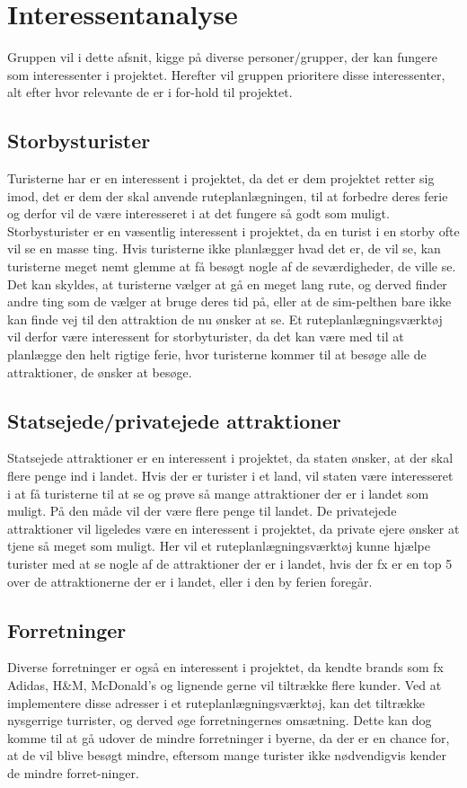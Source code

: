 \section{Interessentanalyse}

Gruppen vil i dette afsnit, kigge på diverse personer/grupper, der kan fungere som interessenter i projektet. Herefter vil gruppen prioritere disse interessenter, alt efter hvor relevante de er i for-hold til projektet.

\subsection{Storbysturister}
Turisterne har er en interessent i projektet, da det er dem projektet retter sig imod, det er dem der skal anvende ruteplanlægningen, til at forbedre deres ferie og derfor vil de være interesseret i at det fungere så godt som muligt. 
Storbysturister er en væsentlig interessent i projektet, da en turist i en storby ofte vil se en masse ting. Hvis turisterne ikke planlægger hvad det er, de vil se, kan turisterne meget nemt glemme at få besøgt nogle af de seværdigheder, de ville se. Det kan skyldes, at turisterne vælger at gå en meget lang rute, og derved finder andre ting som de vælger at bruge deres tid på, eller at de sim-pelthen bare ikke kan finde vej til den attraktion de nu ønsker at se. Et ruteplanlægningsværktøj vil derfor være interessent for storbyturister, da det kan være med til at planlægge den helt rigtige ferie, hvor turisterne kommer til at besøge alle de attraktioner, de ønsker at besøge.

\subsection{Statsejede/privatejede attraktioner}
Statsejede attraktioner er en interessent i projektet, da staten ønsker, at der skal flere penge ind i landet. Hvis der er turister i et land, vil staten være interesseret i at få turisterne til at se og prøve så mange attraktioner der er i landet som muligt. På den måde vil der være flere penge til landet. 
De privatejede attraktioner vil ligeledes være en interessent i projektet, da private ejere ønsker at tjene så meget som muligt. 
Her vil et ruteplanlægningsværktøj kunne hjælpe turister med at se nogle af de attraktioner der er i landet, hvis der fx er en top 5 over de attraktionerne der er i landet, eller i den by ferien foregår.

\subsection{Forretninger} 
Diverse forretninger er også en interessent i projektet, da kendte brands som fx Adidas, H\&M, McDonald’s og lignende gerne vil tiltrække flere kunder. Ved at implementere disse adresser i et ruteplanlægningsværktøj, kan det tiltrække nysgerrige turrister, og derved øge forretningernes omsætning. 
Dette kan dog komme til at gå udover de mindre forretninger i byerne, da der er en chance for, at de vil blive besøgt mindre, eftersom mange turister ikke nødvendigvis kender de mindre forret-ninger. 

